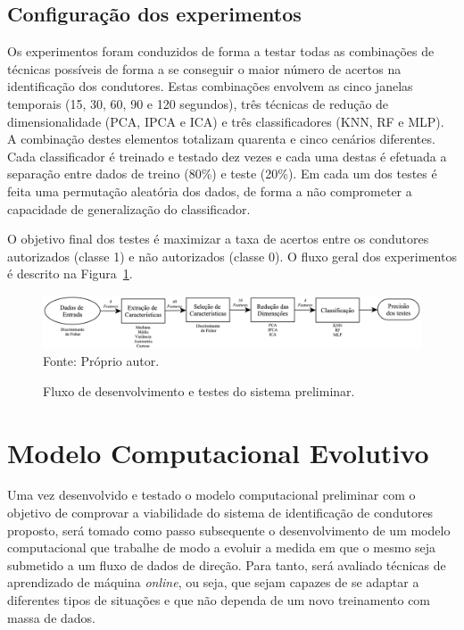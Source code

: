 \subsection{Configuração dos experimentos}

Os experimentos foram conduzidos de forma a testar todas as combinações de técnicas possíveis de forma a se conseguir  o maior número de acertos na identificação dos condutores. Estas combinações envolvem as cinco janelas temporais (15, 30, 60, 90 e 120 segundos), três técnicas de redução de dimensionalidade (PCA, IPCA e ICA) e três classificadores (KNN, RF e MLP). A combinação destes elementos totalizam quarenta e cinco cenários diferentes. Cada classificador é treinado e testado dez vezes e cada uma destas é efetuada a separação entre dados de treino (80\%) e teste (20\%). Em cada um dos testes é feita uma permutação aleatória dos dados, de forma a não comprometer a capacidade de generalização do classificador.

O objetivo final dos testes é maximizar a taxa de acertos entre os condutores autorizados (classe 1) e não autorizados (classe 0). O fluxo geral dos experimentos é descrito na Figura~\ref{fig:fluxo}.

\begin{figure}[!htb]
	\centering
	\caption{Fluxo de desenvolvimento e testes do sistema preliminar.}
	\includegraphics[width=1.\linewidth]{fluxo_projeto.eps}
	{\small Fonte: Próprio autor.} %
	\label{fig:fluxo} %
\end{figure}


\section{Modelo Computacional Evolutivo}

Uma vez desenvolvido e testado o modelo computacional preliminar com o objetivo de comprovar a viabilidade do sistema de identificação de condutores proposto, será tomado como passo subsequente o desenvolvimento de um modelo computacional que trabalhe de modo a evoluir a medida em que o mesmo seja submetido a um fluxo de dados de direção. Para tanto, será avaliado técnicas de aprendizado de máquina \textit{online}, ou seja, que sejam capazes de se adaptar a diferentes tipos de situações e que não dependa de um novo treinamento com massa de dados.

